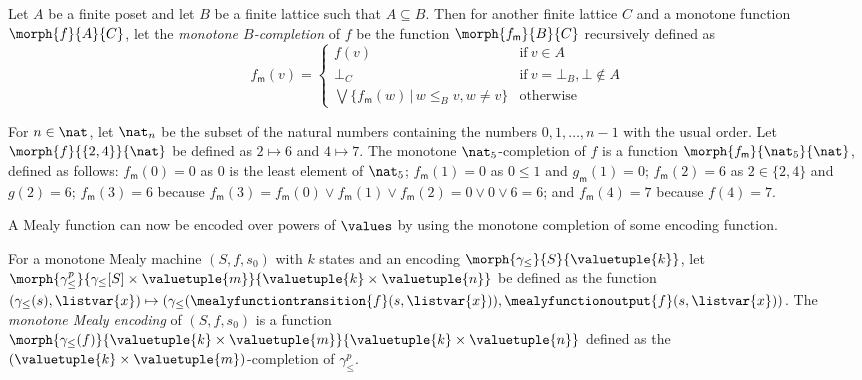 \documentclass{lmcs}
\begin{document}
\begin{defi}\label{def:monotone-completion}
    Let \(A\) be a finite poset and let \(B\) be a finite lattice such that
    \(A \subseteq B\).
    Then for another finite lattice \(C\) and a monotone function
    \(\morph{f}{A}{C}\), let the \emph{monotone \(B\)-completion} of \(f\) be
    the function \(\morph{f_\mathsf{m}}{B}{C}\) recursively defined as \[
        f_\mathsf{m}(v) = \begin{cases}
            f(v)
             &
            \text{if}\ v \in A
            \\
            \bot_C
             &
            \text{if}\ v = \bot_B, \bot \not\in A
            \\
            \bigvee \{ f_\mathsf{m}(w) \,|\, w \leq_B v, w \neq v \}
             &
            \text{otherwise}
        \end{cases}
    \]
\end{defi}

\begin{exa}
    For \(n \in \nat\), let \(\nat_{n}\) be the subset of the natural numbers
    containing the numbers \(0,1,\dots,n-1\) with the usual order.
    Let \(\morph{f}{\{2,4\}}{\nat}\) be defined as \(2 \mapsto 6\) and
    \(4 \mapsto 7\).
    The monotone \(\nat_5\)-completion of \(f\) is a function
    \(\morph{f_\mathsf{m}}{\nat_5}{\nat}\), defined as follows:
    \(f_\mathsf{m}(0) = 0\) as \(0\) is the least element of \(\nat_5\);
    \(f_\mathsf{m}(1) = 0\) as \(0 \leq 1\) and \(g_\mathsf{m}(1) = 0\);
    \(f_\mathsf{m}(2) = 6\) as \(2 \in \{2, 4\}\) and \(g(2) = 6\);
    \(f_\mathsf{m}(3) = 6\) because \(
    f_\mathsf{m}(3) =
    f_\mathsf{m}(0) \vee f_\mathsf{m}(1) \vee f_\mathsf{m}(2)
    = 0 \vee 0 \vee 6 = 6
    \); and \(f_\mathsf{m}(4) = 7\) because \(f(4) = 7\).
\end{exa}

A Mealy function can now be encoded over powers of \(\values\) by using the
monotone completion of some encoding function.

\begin{defi}\label{def:mealy-encoding}
    For a monotone Mealy machine \((S, f, s_0)\) with \(k\) states and an
    encoding \(\morph{\gamma_\leq}{S}{\valuetuple{k}}\), let
    \(\morph{\gamma^p_\leq}{\gamma_\leq[S] \times \valuetuple{m}}{\valuetuple{k} \times \valuetuple{n}}\)
    be defined as the function \(
    (\gamma_\leq(s), \listvar{x}) \mapsto
    (\gamma_\leq(\mealyfunctiontransition{f}(s, \listvar{x})),
    \mealyfunctionoutput{f}(s, \listvar{x}))
    \).
    The \emph{monotone Mealy encoding} of \((S, f, s_0)\) is a function
    \(
    \morph{
        \gamma_\leq(f)
    }{
        \valuetuple{k} \times \valuetuple{m}
    }{
        \valuetuple{k} \times \valuetuple{n}
    }
    \) defined as the \((\valuetuple{k} \times \valuetuple{m})\)-completion of
    \(\gamma_\leq^p\).
\end{defi}
\end{document}
